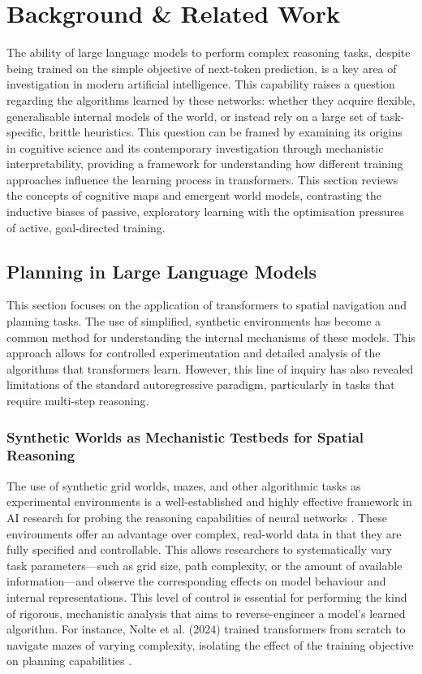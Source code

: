 \chapter{Background \& Related Work}

The ability of large language models to perform complex reasoning tasks, despite being trained on the simple objective of next-token prediction, is a key area of investigation in modern artificial intelligence. This capability raises a question regarding the algorithms learned by these networks: whether they acquire flexible, generalisable internal models of the world, or instead rely on a large set of task-specific, brittle heuristics. This question can be framed by examining its origins in cognitive science and its contemporary investigation through mechanistic interpretability, providing a framework for understanding how different training approaches influence the learning process in transformers. This section reviews the concepts of cognitive maps and emergent world models, contrasting the inductive biases of passive, exploratory learning with the optimisation pressures of active, goal-directed training.

\section{Planning in Large Language Models}

This section focuses on the application of transformers to spatial navigation and planning tasks. The use of simplified, synthetic environments has become a common method for understanding the internal mechanisms of these models. This approach allows for controlled experimentation and detailed analysis of the algorithms that transformers learn. However, this line of inquiry has also revealed limitations of the standard autoregressive paradigm, particularly in tasks that require multi-step reasoning.

\subsection{Synthetic Worlds as Mechanistic Testbeds for Spatial Reasoning}

The use of synthetic grid worlds, mazes, and other algorithmic tasks as experimental environments is a well-established and highly effective framework in AI research for probing the reasoning capabilities of neural networks \cite{trigonometry, bachmann2024ntp, chughtai2023toymodel, nanda2023progress, nolte2024spatial}. These environments offer an advantage over complex, real-world data in that they are fully specified and controllable. This allows researchers to systematically vary task parameters—such as grid size, path complexity, or the amount of available information—and observe the corresponding effects on model behaviour and internal representations. This level of control is essential for performing the kind of rigorous, mechanistic analysis that aims to reverse-engineer a model's learned algorithm. For instance, Nolte et al. (2024) trained transformers from scratch to navigate mazes of varying complexity, isolating the effect of the training objective on planning capabilities \citep{nolte2024spatial}. 

